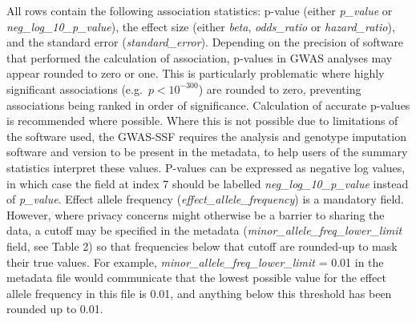 \documentclass[11pt]{article}
\begin{document}
All rows contain the following association statistics: p-value (either \textit{p\_value} or \textit{neg\_log\_10\_p\_value}), the effect size (either \textit{beta}, \textit{odds\_ratio} or \textit{hazard\_ratio}), and the standard error (\textit{standard\_error}). Depending on the precision of software that performed the calculation of association, p-values in GWAS analyses may appear rounded to zero or one. This is particularly problematic where highly significant associations (e.g.\ $p < 10^{-300}$) are rounded to zero, preventing associations being ranked in order of significance. Calculation of accurate p-values is recommended where possible. Where this is not possible due to limitations of the software used, the GWAS-SSF requires the analysis and genotype imputation software and version to be present in the metadata, to help users of the summary statistics interpret these values. P-values can be expressed as negative log values, in which case the field at index 7 should be labelled \textit{neg\_log\_10\_p\_value} instead of \textit{p\_value}. Effect allele frequency (\textit{effect\_allele\_frequency}) is a mandatory field. However, where privacy concerns might otherwise be a barrier to sharing the data, a cutoff may be specified in the metadata (\textit{minor\_allele\_freq\_lower\_limit} field, see Table 2) so that frequencies below that cutoff are rounded-up to mask their true values. For example, \textit{minor\_allele\_freq\_lower\_limit} = 0.01 in the metadata file would communicate that the lowest possible value for the effect allele frequency in this file is 0.01, and anything below this threshold has been rounded up to 0.01.
\end{document}

